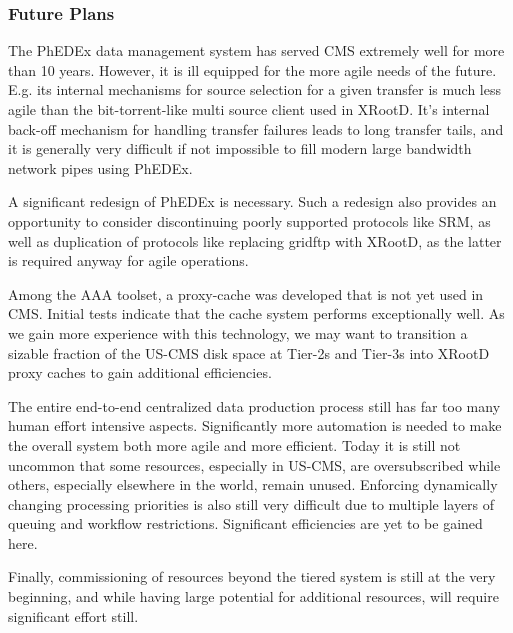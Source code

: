 \documentclass[11pt,a4paper]{article}
\begin{document}

\subsubsection{Future Plans}

The PhEDEx data management system has served CMS extremely well for more than 10 years.
However, it is ill equipped for the more agile needs of the future. E.g. its internal mechanisms for
source selection for a given transfer is much less agile than the bit-torrent-like multi source client
used in XRootD. It's internal back-off mechanism for handling transfer failures leads to long transfer
tails, and it is generally very difficult if not impossible to fill modern large bandwidth network pipes using PhEDEx.

A significant redesign of PhEDEx is necessary. 
Such a redesign also provides an opportunity to consider discontinuing poorly supported protocols like SRM, 
as well as duplication of protocols like replacing gridftp with XRootD, as the latter is required anyway
for agile operations.

Among the AAA toolset, a proxy-cache was developed that is not yet used in CMS. 
Initial tests indicate that the cache system performs exceptionally well. As we gain more experience with this technology, 
we may want to transition a sizable  fraction of the US-CMS disk space at Tier-2s and Tier-3s into XRootD proxy caches
to gain additional efficiencies.

The entire end-to-end centralized data production process still has far too many human effort intensive aspects.
Significantly more automation is needed to make the overall system both more agile and more efficient. Today it is still not uncommon
that some resources, especially in US-CMS, are oversubscribed while others, especially elsewhere in the world, remain unused. 
Enforcing dynamically changing processing priorities is also still very difficult due to multiple layers of queuing and workflow
restrictions. Significant efficiencies are yet to be gained here.

Finally, commissioning of resources beyond the tiered system is still at the very beginning, and while having large potential
for additional resources, will require significant effort still.
\end{document}
